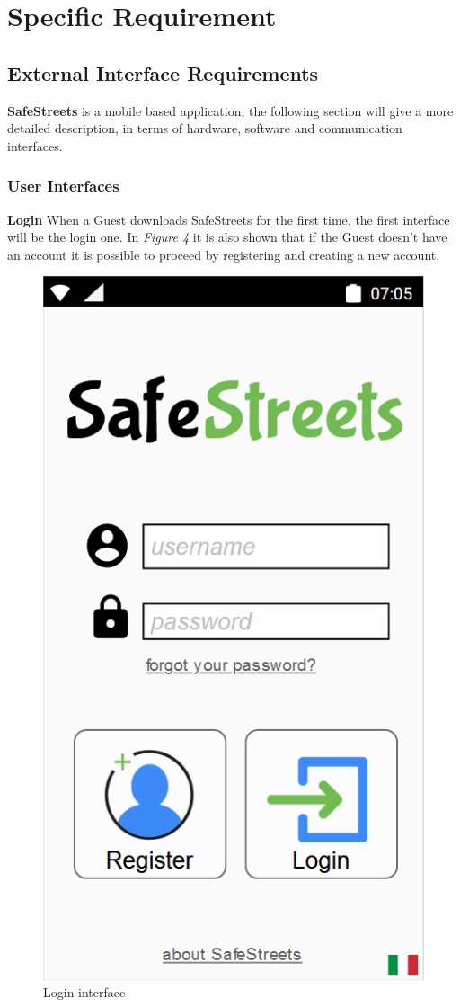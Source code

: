\section{Specific Requirement}

\subsection{External Interface Requirements}
\textbf{SafeStreets} is a mobile based application, the following section will give a more detailed description, in terms of hardware, software and communication interfaces.
\subsubsection{User Interfaces}
    \textbf{Login} \newline When a Guest downloads SafeStreets for the first time, the first interface will be the login one. In \textit{Figure 4} it is also shown that if the Guest doesn't have an account it is possible to proceed by registering and creating a new account.\vspace{1cm}
    \begin{figure}[h]
        \centering
        \includegraphics[scale=0.7]{Images/login.png}
        \caption{Login interface}
    \end{figure}\newpage
